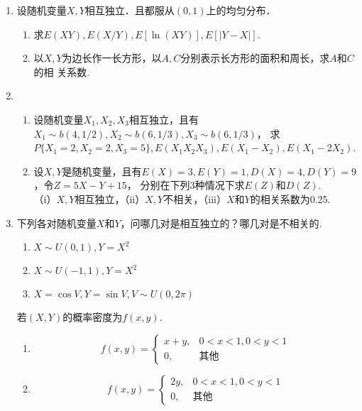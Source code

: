 \documentclass[10pt,a4paper]{article}
\begin{document}
\begin{enumerate}
    \item 设随机变量$X,Y$相互独立．且都服从$(0,1)$上的均匀分布．
    \begin{enumerate}
        \item 求$E(XY),E(X/Y),E[\ln (XY)],E[|Y-X|]$.
        \item 以$X,Y$为边长作一长方形，以$A,C$分别表示长方形的面积和周长，求$A$和$C$的相
        关系数.
    \end{enumerate}
    \vspace{10cm}



    \item \begin{enumerate}
        \item 设随机变量$X_1,X_2,X_3$相互独立，且有$X_1\sim b(4,1/2),X_2\sim b(6,1/3),X_3\sim b(6,1/3)$，
        求$P\{X_1=2,X_2=2,X_3=5\},E(X_1X_2X_3),E(X_1-X_2),E(X_1-2X_2)$.
        \item 设$X,Y$是随机变量，且有$E(X)=3,E(Y)=1,D(X)=4,D(Y)=9$，令$Z=5X-Y+15$，
        分别在下列3种情况下求$E(Z)$和$D(Z)$.\\
        （i）$X,Y$相互独立，（ii）$X,Y$不相关，（iii）$X$和$Y$的相关系数为0.25.
    \end{enumerate}
    \vspace{10cm}


    \item 下列各对随机变量$X$和$Y$，问哪几对是相互独立的？哪几对是不相关的.
    \begin{enumerate}
        \item $X\sim U(0,1),Y=X^2$
        \item $X\sim U(-1,1),Y=X^2$
        \item $X=\cos V,Y=\sin V, V\sim U(0,2\pi)$ \par
    \end{enumerate}
    若$(X,Y)$的概率密度为$f(x,y)$.
    \begin{enumerate}[resume]
        \item $$f(x,y)=\left\{\begin{array}{ll}
            x+y, & 0<x<1,0<y<1 \\
            0, & \mbox{其他}
        \end{array}\right.$$
        \item $$f(x,y)=\left\{\begin{array}{ll}
            2y, & 0<x<1,0<y<1\\
            0, & \mbox{其他}
        \end{array}\right.$$
    \end{enumerate}
    \vspace{7cm}




\end{enumerate}
\end{document}
